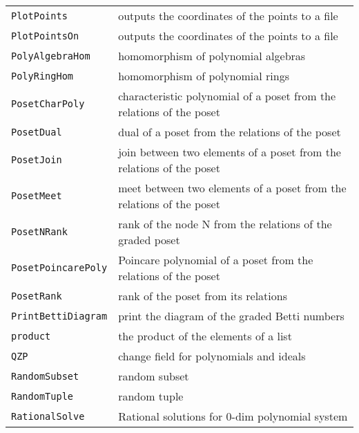 \documentclass[a4paper]{mybook}
\begin{document}
\begin{center}
\begin{longtable}{ll}
{\verb~PlotPoints~} &
      outputs the coordinates of the points to a file\\
   
{\verb~PlotPointsOn~} &
      outputs the coordinates of the points to a file\\
   
{\verb~PolyAlgebraHom~} &
      homomorphism of polynomial algebras\\
   
{\verb~PolyRingHom~} &
      homomorphism of polynomial rings\\
   
{\verb~PosetCharPoly~} &
      characteristic polynomial of a poset from the relations of the poset\\
   
{\verb~PosetDual~} &
      dual of a poset from the relations of the poset\\
   
{\verb~PosetJoin~} &
      join between two elements of a poset from the relations of the poset\\
   
{\verb~PosetMeet~} &
      meet between two elements of a poset from the relations of the poset\\
   
{\verb~PosetNRank~} &
      rank of the node N from the relations of the graded poset\\
   
{\verb~PosetPoincarePoly~} &
      Poincare polynomial of a poset from the relations of the poset\\
   
{\verb~PosetRank~} &
      rank of the poset from its relations\\
   
{\verb~PrintBettiDiagram~} &
      print the diagram of the graded Betti numbers\\
   
{\verb~product~} &
      the product of the elements of a list\\
   
{\verb~QZP~} &
      change field for polynomials and ideals\\
   
{\verb~RandomSubset~} &
      random subset\\
   
{\verb~RandomTuple~} &
      random tuple\\
   
{\verb~RationalSolve~} &
      Rational solutions for 0-dim polynomial system\\
   

\end{longtable}
\end{center}
\end{document}
